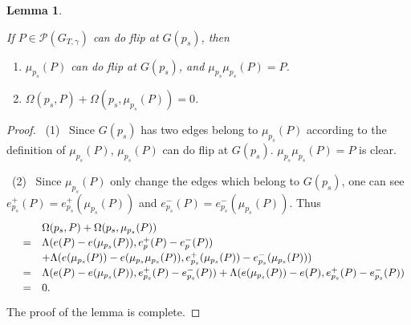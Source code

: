 \documentclass[10pt]{amsart}
\theoremstyle{theorems}
\newtheorem{Lemma}[Theorem]{Lemma}
\begin{document}
\begin{Lemma}\label{invo}

If $P\in \mathcal P(G_{T,\gamma})$ can do flip at $G(p_s)$, then

\begin{enumerate}[$(1)$]

  \item $\mu_{p_s}(P)$ can do flip at $G(p_s)$, and $\mu_{p_s}\mu_{p_s}(P)=P$.

  \item $\Omega(p_s,P)+\Omega(p_s,\mu_{p_s}(P))=0$.

\end{enumerate}

\end{Lemma}

\begin{proof}

~(1)~ Since $G(p_s)$ has two edges belong to $\mu_{p_s}(P)$ according to the definition of $\mu_{p_s}(P)$, $\mu_{p_s}(P)$ can do flip at $G(p_s)$. $\mu_{p_s}\mu_{p_s}(P)=P$ is clear.

~(2)~ Since $\mu_{p_s}(P)$ only change the edges which belong to $G(p_s)$, one can see $e_{p_s}^{+}(P)=e_{p_s}^{+}(\mu_{p_s}(P))$ and $e_{p_s}^{-}(P)=e_{p_s}^{-}(\mu_{p_s}(P))$. Thus
$$\begin{array}{rcl} && \Omega(p_s,P)+\Omega(p_s,\mu_{p_s}(P)) \vspace{2pt}  \\

& = & \Lambda(e(P)-e(\mu_{p_s}(P)), e_p^{+}(P)-e_p^{-}(P)) \vspace{2pt}  \\

&& +\Lambda(e(\mu_{p_s}(P))-e(\mu_{p_s}\mu_{p_s}(P)), e_{p_s}^{+}(\mu_{p_s}(P))-e_{p_s}^{-}(\mu_{p_s}(P)))\vspace{2pt}  \\

& = & \Lambda(e(P)-e(\mu_{p_s}(P)), e_{p_s}^{+}(P)-e_{p_s}^{-}(P))+\Lambda(e(\mu_{p_s}(P))-e(P), e_{p_s}^{+}(P)-e_{p_s}^{-}(P)) \vspace{2pt} \\

& = & 0.\vspace{2pt} \\

\end{array}$$
The proof of the lemma is complete.
\end{proof}

\medskip
\end{document}

